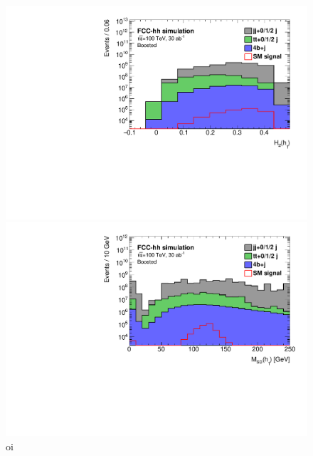 \begin{figure}
	\centering
	\begin{minipage}{.5\textwidth}
		\centering
		\includegraphics[width=\linewidth]{./images/hist_h1_FW2.pdf}
	\end{minipage}%
	\begin{minipage}{.5\textwidth}
		\centering
		\includegraphics[width=\linewidth]{./images/hist_h1_SD_M.pdf}
	\end{minipage}
	\caption{oi}
\end{figure}

%


